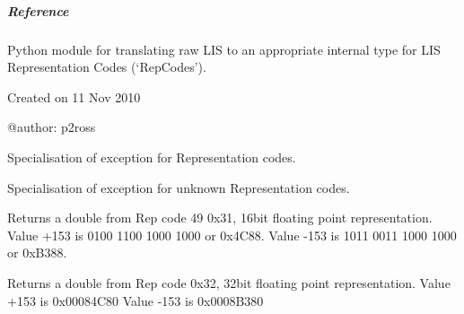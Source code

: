 \documentclass[letterpaper,10pt,english]{sphinxmanual}
\begin{document}
\subparagraph{Reference}
\label{\detokenize{ref/LIS/core/RepCode:id2}}\label{\detokenize{ref/LIS/core/RepCode:module-TotalDepth.LIS.core.pRepCode}}
Python module for translating raw LIS to an appropriate internal type for LIS
Representation Codes (‘RepCodes’).

Created on 11 Nov 2010

@author: p2ross

\begin{fulllineitems}
\label{\detokenize{ref/LIS/core/RepCode:TotalDepth.LIS.core.pRepCode.ExceptionRepCode}}
Specialisation of exception for Representation codes.

\end{fulllineitems}


\begin{fulllineitems}
\label{\detokenize{ref/LIS/core/RepCode:TotalDepth.LIS.core.pRepCode.ExceptionRepCodeUnknown}}
Specialisation of exception for unknown Representation codes.

\end{fulllineitems}


\begin{fulllineitems}
\label{\detokenize{ref/LIS/core/RepCode:TotalDepth.LIS.core.pRepCode.from49}}
Returns a double from Rep code 49 0x31, 16bit floating point representation.
Value +153 is 0100 1100 1000 1000 or 0x4C88.
Value -153 is 1011 0011 1000 1000 or 0xB388.

\end{fulllineitems}


\begin{fulllineitems}
\label{\detokenize{ref/LIS/core/RepCode:TotalDepth.LIS.core.pRepCode.from50}}
Returns a double from Rep code 0x32, 32bit floating point representation.
Value +153 is 0x00084C80
Value -153 is 0x0008B380

\end{fulllineitems}
\end{document}
